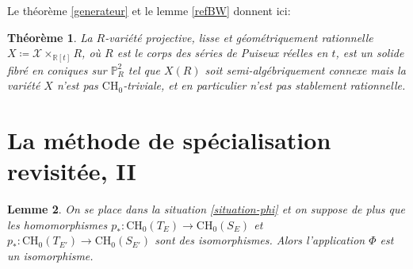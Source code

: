 \documentclass[11pt]{article}
\newcommand{\CH}{\mathrm{CH}}
\newtheorem{thm}{Théorème}[section]
\newtheorem{lemma}[thm]{Lemme}
\theoremstyle{definition}
\newcommand{\R}{\mathbb R}
\renewcommand{\P}{\mathbb P}
\newcommand{\mc}[1]{\mathcal{#1}}
\begin{document}
Le théorème \ref{generateur} et le lemme \ref{refBW} donnent ici:

\begin{thm}\label{prop-fibres-coniques}
La $R$-variété projective, lisse et géométriquement rationnelle
$X\coloneqq \mc{X}\times_{\R[t]}R$, où $R$ est le corps des séries de Puiseux réelles en $t$, est un solide fibré en coniques sur $\P^2_R$ tel que $X(R)$ soit semi-algébriquement connexe mais la variété $X$ n'est pas $\CH_0$-triviale, et en particulier n'est pas stablement rationnelle.
\end{thm}

\section{La méthode de spécialisation revisitée, II}\label{methode-2}

\begin{lemma}\label{lemme-phi-isomorphisme-variante}
On se place dans la situation \ref{situation-phi} et on suppose de plus que les homomorphismes $p_*\colon \CH_0(T_{E})\to \CH_0(S_{E})$ et $p_*\colon \CH_0(T_{E'})\to \CH_0(S_{E'})$ sont des isomorphismes. Alors l'application $\Phi$ est un isomorphisme.
\end{lemma}
\end{document}
